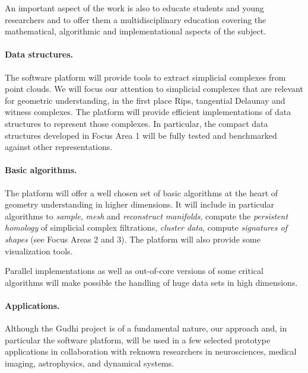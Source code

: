 An important aspect of the work is also to educate students and young
researchers and to offer them a multidisciplinary education covering
the mathematical, algorithmic and implementational aspects of the subject.


\paragraph{Data structures.}
The software platform will provide tools to extract simplicial
complexes from point clouds. We will focus our attention to simplicial
complexes that are relevant for geometric understanding, in the first
place Rips,
tangential Delaunay and witness complexes.  The platform will provide
efficient implementations of data structures to represent those
complexes. In particular, the compact data structures developed in
Focus Area 1 will be fully tested and benchmarked against other
representations.

\paragraph{Basic algorithms.}
The platform will offer a well chosen set of basic algorithms at the
heart of geometry understanding in higher dimensions. It will include
in particular algorithms to {\em sample}, {\em mesh} and {\em
reconstruct manifolds}, compute the {\em persistent homology} of
simplicial complex filtrations, {\em cluster data}, compute {\em
signatures of shapes} (see Focus Areas 2 and 3). The platform will
also provide some visualization tools.


Parallel implementations as well as out-of-core versions of some
critical algorithms %
will make possible the handling of huge data sets in high dimensions.

\paragraph{Applications.}
Although the Gudhi project is of a fundamental nature, our approach
and, in particular the software platform, will be used in a few selected  prototype
applications in collaboration with reknown researchers in neurosciences, medical imaging,
astrophysics, and dynamical systems.%

